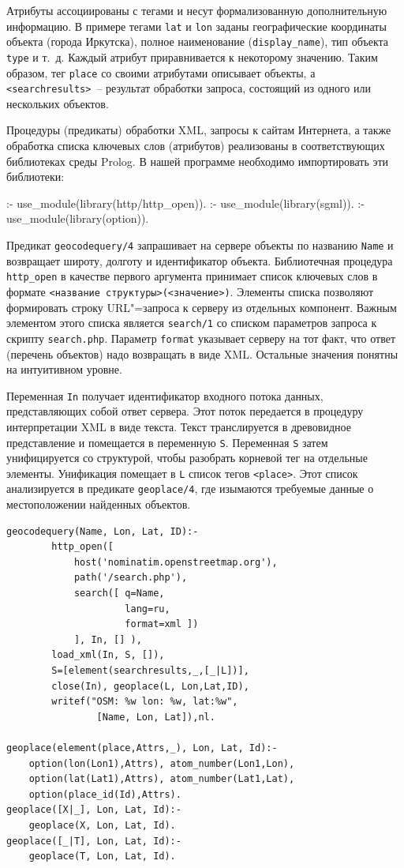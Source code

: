 \documentclass[a4paper,14pt, openany, twoside, final]{extbook} %
\begin{document}
Атрибуты ассоциированы с тегами и несут формализованную дополнительную информацию.  В примере тегами \texttt{lat} и \texttt{lon} заданы географические координаты объекта (города Иркутска), полное наименование (\texttt{display\_name}), тип объекта \texttt{type} и т.~д.  Каждый атрибут приравнивается к некоторому значению.  Таким образом, тег \texttt{place} со своими атрибутами описывает объекты, а \texttt{<searchresults>}~-- результат обработки запроса, состоящий из одного или нескольких объектов.

Процедуры (предикаты) обработки XML, запросы к сайтам Интернета, а также обработка списка ключевых слов (атрибутов) реализованы в соответствующих библиотеках среды Pro\-log.  В нашей программе необходимо импортировать эти библиотеки:

\begin{proexp}
:- use_module(library(http/http_open)).
:- use_module(library(sgml)).   %
:- use_module(library(option)).
\end{proexp}


Предикат \texttt{geocodequery/4} запрашивает на сервере объекты по названию \texttt{Name} и возвращает широту, долготу и идентификатор объекта.  Библиотечная процедура \texttt{http\_open} в качестве первого аргумента принимает список ключевых слов в формате \texttt{<название структуры>(<значение>)}.  Элементы списка позволяют формировать строку URL"=запроса к серверу из отдельных компонент.  Важным элементом этого списка является \texttt{search/1} со списком параметров запроса к скрипту \texttt{search.php}.  Параметр \texttt{format} указывает серверу на тот факт, что ответ (перечень объектов) надо возвращать в виде XML.  Остальные значения понятны на интуитивном уровне.

Переменная \texttt{In} получает идентификатор входного потока данных, представляющих собой ответ сервера.  Этот поток передается в процедуру интерпретации XML в виде текста.  Текст транслируется в древовидное представление и помещается в переменную \texttt{S}.  Переменная \texttt{S} затем унифицируется со структурой, чтобы разобрать корневой тег на отдельные элементы.  Унификация помещает в \texttt{L} список тегов \texttt{<place>}.  Этот список анализируется в предикате \texttt{geoplace/4}, где изымаются требуемые данные о местоположении найденных объектов.\enlargethispage{-1em}

\begin{verbatim}
geocodequery(Name, Lon, Lat, ID):-
        http_open([
            host('nominatim.openstreetmap.org'),
            path('/search.php'),
            search([ q=Name,
                     lang=ru,
                     format=xml ])
            ], In, [] ),
        load_xml(In, S, []),
        S=[element(searchresults,_,[_|L])],
        close(In), geoplace(L, Lon,Lat,ID),
        writef("OSM: %w lon: %w, lat:%w",
                [Name, Lon, Lat]),nl.

geoplace(element(place,Attrs,_), Lon, Lat, Id):-
    option(lon(Lon1),Attrs), atom_number(Lon1,Lon),
    option(lat(Lat1),Attrs), atom_number(Lat1,Lat),
    option(place_id(Id),Attrs).
geoplace([X|_], Lon, Lat, Id):-
    geoplace(X, Lon, Lat, Id).
geoplace([_|T], Lon, Lat, Id):-
    geoplace(T, Lon, Lat, Id).
\end{verbatim}
\end{document}
